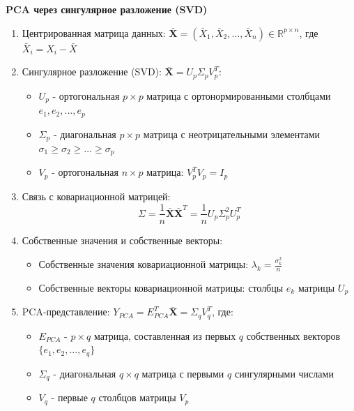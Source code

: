 \documentclass[a4paper,12pt]{article}
\begin{document}
\textbf{PCA через сингулярное разложение (SVD)}

\begin{enumerate}
    \item Центрированная матрица данных: $\bar{\mathbf{X}} = (\bar{X}_1, \bar{X}_2, \ldots, \bar{X}_n) \in \mathbb{R}^{p \times n}$, где $\bar{X}_i = X_i - \bar{X}$

    \item Сингулярное разложение (SVD): $\bar{\mathbf{X}} = U_p \Sigma_p V_p^T$:
    \begin{itemize}
        \item $U_p$ - ортогональная $p \times p$ матрица с ортонормированными столбцами $e_1, e_2, \ldots, e_p$
        \item $\Sigma_p$ - диагональная $p \times p$ матрица с неотрицательными элементами $\sigma_1 \geq \sigma_2 \geq \ldots \geq \sigma_p$
        \item $V_p$ - ортогональная $n \times p$ матрица: $V_p^T V_p = I_p$
    \end{itemize}

    \item Связь с ковариационной матрицей:
    $$\Sigma = \frac{1}{n} \bar{\mathbf{X}} \bar{\mathbf{X}}^T = \frac{1}{n} U_p \Sigma_p^2 U_p^T$$

    \item Собственные значения и собственные векторы:
    \begin{itemize}
        \item Собственные значения ковариационной матрицы: $\lambda_k = \frac{\sigma_k^2}{n}$
        \item Собственные векторы ковариационной матрицы: столбцы $e_k$ матрицы $U_p$
    \end{itemize}

    \item PCA-представление: $Y_{PCA} = E_{PCA}^T \bar{\mathbf{X}} = \Sigma_q V_q^T$, где:
    \begin{itemize}
        \item $E_{PCA}$ - $p \times q$ матрица, составленная из первых $q$ собственных векторов $\{e_1, e_2, \ldots, e_q\}$
        \item $\Sigma_q$ - диагональная $q \times q$ матрица с первыми $q$ сингулярными числами
        \item $V_q$ - первые $q$ столбцов матрицы $V_p$
    \end{itemize}
\end{enumerate}
\end{document}
